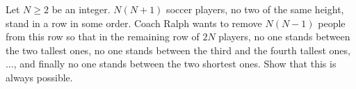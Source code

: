 Let $N \geq 2$ be an integer. $N(N+1)$ soccer players, no two of the same height, stand in a row in some order. Coach Ralph wants to remove $N(N-1)$ people from this row so that in the remaining row of $2N$ players, no one stands between the two tallest ones, no one stands between the third and the fourth tallest ones, $\ldots$, and finally no one stands between the two shortest ones. Show that this is always possible.
